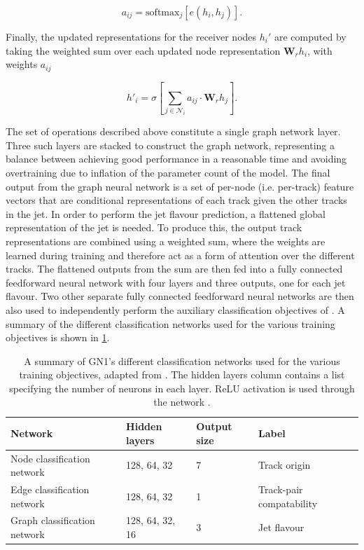 \begin{equation}\label{eq:attention weights}
    a_{ij} = \mathrm{softmax}_j \left[ e(h_i, h_j) \right].
\end{equation}

Finally, the updated representations for the receiver nodes $h_i'$ are computed by taking the weighted sum over each updated node representation $\mathbf{W}_r h_i$, with weights $a_{ij}$

\begin{equation}\label{eq:updated_node_rep}
    h'_i = \sigma \left[ \sum_{j \in \mathcal{N}_i}{a_{ij} \cdot \mathbf{W}_r {h}_j}  \right].
\end{equation}

The set of operations described above constitute a single graph network layer. 
Three such layers are stacked to construct the graph network, representing a balance between achieving good performance in a reasonable time and avoiding overtraining due to inflation of the parameter count of the model.
The final output from the graph neural network is a set of per-node (i.e. per-track) feature vectors that are conditional representations of each track given the other tracks in the jet.
In order to perform the jet flavour prediction, a flattened global representation of the jet is needed.
To produce this, the output track representations are combined using a weighted sum, where the weights are learned during training and therefore act as a form of attention over the different tracks.
The flattened outputs from the sum are then fed into a fully connected feedforward neural network with four layers and three outputs, one for each jet flavour.
Two other separate fully connected feedforward neural networks are then also used to independently perform the auxiliary classification objectives of \GNN.
A summary of the different classification networks used for the various training objectives is shown in \cref{tab:architecture}.

\begin{table}[!htbp]
  \footnotesize\centering
  \setlength{\tabcolsep}{0.5em} %
  \begin{tabular}{llll}
      \toprule\hline 
      \textbf{Network} & \textbf{Hidden layers} & \textbf{Output size} & \textbf{Label} \\
      \hline
      Node classification network    & 128, 64, 32 & 7 & Track origin \\
      Edge classification network    & 128, 64, 32 & 1 & Track-pair compatability \\
      Graph classification network   & 128, 64, 32, 16 & 3 & Jet flavour \\
      \hline\bottomrule
  \end{tabular}
  \caption{
    A summary of GN1's different classification networks used for the various training objectives, adapted from .
    The hidden layers column contains a list specifying the number of neurons in each layer.
    ReLU activation is used through the network \cite{2018arXiv180308375A}.
  }
  \label{tab:architecture}
\end{table}


